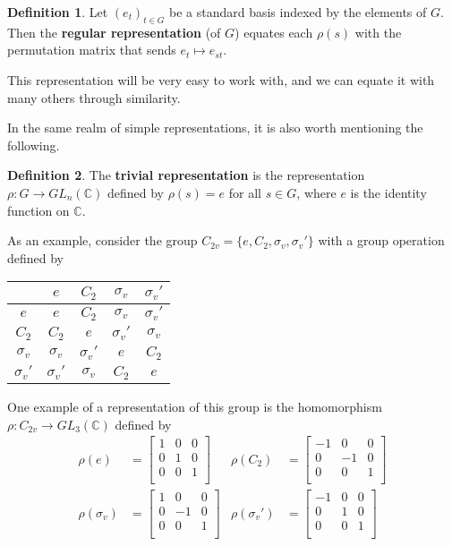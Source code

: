\documentclass[openany, amssymb, psamsfonts]{amsart}
\theoremstyle{definition}
\newtheorem{defn}{Definition}[section]
\numberwithin{equation}{section}
\begin{document}
\begin{defn}
    Let $(e_t)_{t\in G}$ be a standard basis indexed by the elements of $G$. Then the \textbf{regular representation} (of $G$) equates each $\rho(s)$ with the permutation matrix that sends $e_t\mapsto e_{st}$.
\end{defn}
This representation will be very easy to work with, and we can equate it with many others through similarity.\par
In the same realm of simple representations, it is also worth mentioning the following.
\begin{defn}
    The \textbf{trivial representation} is the representation $\rho:G\to GL_n(\mathbb{C})$ defined by $\rho(s)=e$ for all $s\in G$, where $e$ is the identity function on $\mathbb{C}$.
\end{defn}
As an example, consider the group $C_{2v}=\{e,C_2,\sigma_v,\sigma_v'\}$ with a group operation defined by
\begin{center}
    \begin{tabular}{c|cccc}
                    & $e$         & $C_2$       & $\sigma_v$  & $\sigma_v'$\\
        \hline
        $e$         & $e$         & $C_2$       & $\sigma_v$  & $\sigma_v'$\\
        $C_2$       & $C_2$       & $e$         & $\sigma_v'$ & $\sigma_v$ \\
        $\sigma_v$  & $\sigma_v$  & $\sigma_v'$ & $e$         & $C_2$      \\
        $\sigma_v'$ & $\sigma_v'$ & $\sigma_v$  & $C_2$       & $e$        \\
    \end{tabular}
\end{center}
One example of a representation of this group is the homomorphism $\rho:C_{2v}\to GL_3(\mathbb{C})$ defined by
\begin{align*}
    \rho(e) &=
    \begin{bmatrix}
        1 & 0 & 0\\
        0 & 1 & 0\\
        0 & 0 & 1\\
    \end{bmatrix}&
        \rho(C_2) &=
        \begin{bmatrix}
            -1 & 0 & 0\\
            0 & -1 & 0\\
            0 & 0 & 1\\
        \end{bmatrix}\\
    \rho(\sigma_v) &=
    \begin{bmatrix}
        1 & 0 & 0\\
        0 & -1 & 0\\
        0 & 0 & 1\\
    \end{bmatrix}&
        \rho(\sigma_v') &=
        \begin{bmatrix}
            -1 & 0 & 0\\
            0 & 1 & 0\\
            0 & 0 & 1\\
        \end{bmatrix}
\end{align*}
\end{document}
